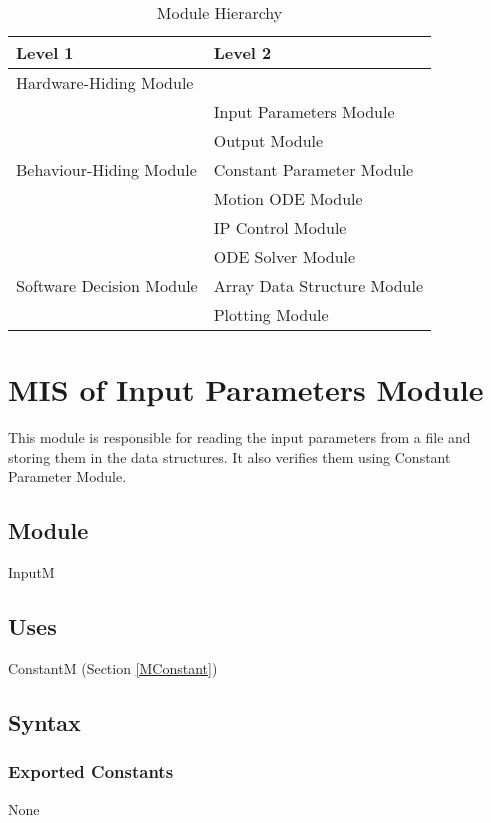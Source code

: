\documentclass[12pt, titlepage]{article}
\begin{document}
\begin{table}[h!]
\centering
\begin{tabular}{p{} p{}}
\toprule
\textbf{Level 1} & \textbf{Level 2}\\
\midrule

{Hardware-Hiding Module} & ~ \\
\midrule

\multirow{5}{0.3\textwidth}{Behaviour-Hiding Module} & Input Parameters Module\\
& Output Module\\
& Constant Parameter Module\\
&Motion ODE  Module\\
& IP Control Module\\
\midrule

\multirow{3}{0.3\textwidth}{Software Decision Module} & {ODE Solver Module}\\
& Array Data Structure Module\\
& Plotting Module\\
\bottomrule

\end{tabular}
\caption{Module Hierarchy}
\label{TblMH}
\end{table}

\newpage


\section{ MIS of Input Parameters Module \label{MInput} }
This module is responsible for reading the input parameters from a file and storing them in the data structures. It also verifies them using Constant Parameter Module.

\subsection{Module}
InputM

\subsection{Uses}
ConstantM (Section \ref{MConstant})

\subsection{Syntax}



\subsubsection{Exported Constants}
None
\end{document}
